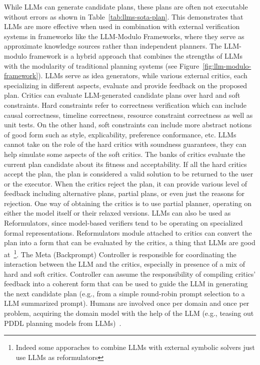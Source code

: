 While LLMs can generate candidate plans, these plans are often not executable without errors as shown in Table~\ref{tab:llms-sota-plan}.
This demonstrates that LLMs are more effective when used in combination with external verification systems in frameworks like the LLM-Modulo Frameworks, where they serve as approximate knowledge sources rather than independent planners.
The LLM-modulo framework is a hybrid approach that combines the strengths of LLMs with the modularity of traditional planning systems (see Figure~\ref{fig:llm-modulo-framework}).
LLMs serve as idea generators, while various external critics, each specializing in different aspects, evaluate and provide feedback on the proposed plan.
Critics can evaluate LLM-generated candidate plans over hard and soft constraints.
Hard constraints refer to correctness verification which can include causal correctness, timeline correctness, resource constraint correctness as well as unit tests.
On the other hand, soft constraints can include more abstract notions of good form such as style, explicability, preference conformance, etc.
LLMs cannot take on the role of the hard critics with soundness guarantees, they can help simulate some aspects of the soft critics.
The banks of critics evaluate the current plan candidate about its fitness and acceptability.
If all the hard critics accept the plan, the plan is considered a valid solution to be returned to the user or the executor.
When the critics reject the plan, it can provide various level of feedback including alternative plans, partial plans, or even just the reasons for rejection.
One way of obtaining the critics is to use partial planner, operating on either the model itself or their relaxed versions\cite{bryce2007tutorial}.
LLMs can also be used as Reformulators, since model-based verifiers tend to be operating on specialized formal representations.
Reformulators module attached to critics can convert the plan into a form that can be evaluated by the critics, a thing that LLMs are good at~\cite{olmo2021gpt3toplan}\footnote{Indeed some apporaches to combine LLMs with external symbolic solvers just use LLMs as reformulators}.
The Meta (Backprompt) Controller is responsible for coordinating the interaction between the LLM and the critics, especially in presence of a mix of hard and soft critics.
Controller can assume the responsibility of compiling critics' feedback into a coherent form that can be used to guide the LLM in generating the next candidate plan (e.g., from a simple round-robin prompt selection to a LLM summarized prompt).
Humans are involved once per domain and once per problem, acquiring the domain model with the help of the LLM (e.g., teasing out PDDL planning models from LLMs)~\cite{guan2023leveraging}.
